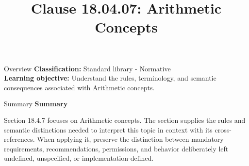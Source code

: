 \documentclass[10pt,letterpaper]{article}
\title{Clause 18.04.07: Arithmetic Concepts}
\author{}
\date{}
\begin{document}
\maketitle
\begin{CornellOverviewBox}{Overview}
\textbf{Classification:} Standard library - Normative\\[2pt]
\textbf{Learning objective:} Understand the rules, terminology, and semantic consequences associated with Arithmetic concepts.
\end{CornellOverviewBox}\begin{CornellSummaryBox}{Summary}
{\sffamily\bfseries\color{Accent} Summary}\par\vspace{3pt}Section 18.4.7 focuses on Arithmetic concepts. The section supplies the rules and semantic distinctions needed to interpret this topic in context with its cross-references. When applying it, preserve the distinction between mandatory requirements, recommendations, permissions, and behavior deliberately left undefined, unspecified, or implementation-defined.
\end{CornellSummaryBox}
\end{document}
